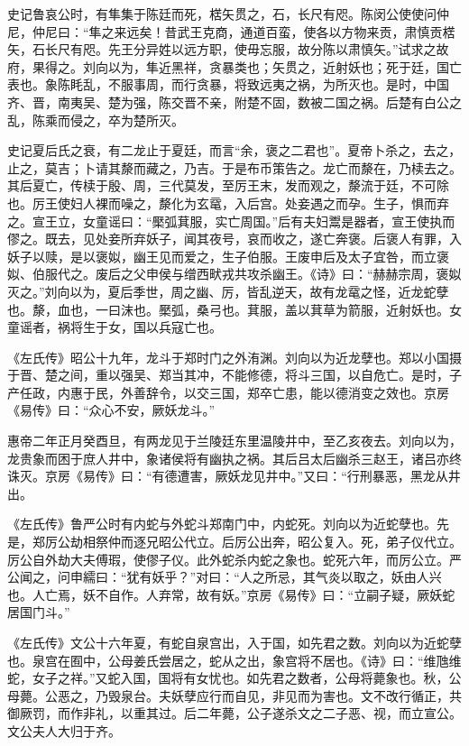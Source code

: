 \documentclass[12pt,UTF8]{ctexbook}
\begin{document}
史记鲁哀公时，有隼集于陈廷而死，楛矢贯之，石，长尺有咫。陈闵公使使问仲尼，仲尼曰：“隼之来远矣！昔武王克商，通道百蛮，使各以方物来贡，肃慎贡楛矢，石长尺有咫。先王分异姓以远方职，使毋忘服，故分陈以肃慎矢。”试求之故府，果得之。刘向以为，隼近黑祥，贪暴类也；矢贯之，近射妖也；死于廷，国亡表也。象陈眊乱，不服事周，而行贪暴，将致远夷之祸，为所灭也。是时，中国齐、晋，南夷吴、楚为强，陈交晋不亲，附楚不固，数被二国之祸。后楚有白公之乱，陈乘而侵之，卒为楚所灭。



史记夏后氏之衰，有二龙止于夏廷，而言“余，褒之二君也”。夏帝卜杀之，去之，止之，莫吉；卜请其漦而藏之，乃吉。于是布币策告之。龙亡而漦在，乃椟去之。其后夏亡，传椟于殷、周，三代莫发，至厉王末，发而观之，漦流于廷，不可除也。厉王使妇人裸而噪之，漦化为玄鼋，入后宫。处妾遇之而孕。生子，惧而弃之。宣王立，女童谣曰：“檿弧萁服，实亡周国。”后有夫妇鬻是器者，宣王使执而僇之。既去，见处妾所弃妖子，闻其夜号，哀而收之，遂亡奔褒。后褒人有罪，入妖子以赎，是以褒姒，幽王见而爱之，生子伯服。王废申后及太子宜咎，而立褒姒、伯服代之。废后之父申侯与缯西畎戎共攻杀幽王。《诗》曰：“赫赫宗周，褒姒灭之。”刘向以为，夏后季世，周之幽、厉，皆乱逆天，故有龙鼋之怪，近龙蛇孽也。漦，血也，一曰沫也。檿弧，桑弓也。萁服，盖以萁草为箭服，近射妖也。女童谣者，祸将生于女，国以兵寇亡也。



《左氏传》昭公十九年，龙斗于郑时门之外洧渊。刘向以为近龙孽也。郑以小国摄于晋、楚之间，重以强吴、郑当其冲，不能修德，将斗三国，以自危亡。是时，子产任政，内惠于民，外善辞令，以交三国，郑卒亡患，能以德消变之效也。京房《易传》曰：“众心不安，厥妖龙斗。”



惠帝二年正月癸酉旦，有两龙见于兰陵廷东里温陵井中，至乙亥夜去。刘向以为，龙贵象而困于庶人井中，象诸侯将有幽执之祸。其后吕太后幽杀三赵王，诸吕亦终诛灭。京房《易传》曰：“有德遭害，厥妖龙见井中。”又曰：“行刑暴恶，黑龙从井出。



《左氏传》鲁严公时有内蛇与外蛇斗郑南门中，内蛇死。刘向以为近蛇孽也。先是，郑厉公劫相祭仲而逐兄昭公代立。后厉公出奔，昭公复入。死，弟子仪代立。厉公自外劫大夫傅瑕，使僇子仪。此外蛇杀内蛇之象也。蛇死六年，而厉公立。严公闻之，问申繻曰：“犹有妖乎？”对曰：“人之所忌，其气炎以取之，妖由人兴也。人亡焉，妖不自作。人弃常，故有妖。”京房《易传》曰：“立嗣子疑，厥妖蛇居国门斗。”



《左氏传》文公十六年夏，有蛇自泉宫出，入于国，如先君之数。刘向以为近蛇孽也。泉宫在囿中，公母姜氏尝居之，蛇从之出，象宫将不居也。《诗》曰：“维虺维蛇，女子之祥。”又蛇入国，国将有女忧也。如先君之数者，公母将薨象也。秋，公母薨。公恶之，乃毁泉台。夫妖孽应行而自见，非见而为害也。文不改行循正，共御厥罚，而作非礼，以重其过。后二年薨，公子遂杀文之二子恶、视，而立宣公。文公夫人大归于齐。
\end{document}
